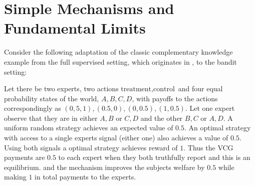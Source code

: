 







\section{Simple Mechanisms and Fundamental Limits}

Consider the following adaptation of the classic complementary knowledge example from the full supervised setting, which originates in \cite{geanakoplos1982we}, to the bandit setting:

\begin{eg}\label{eg:comp-ex}
	Let there be two experts, two actions ${\text{treatment},\text{control}}$ and four equal probability states of the world, ${A,B,C,D}$, with payoffs to the actions correspondingly as ${(0,5,1),(0.5,0),(0,0.5),(1,0.5)}$. Let one expert observe that they are in either ${A,B}$ or ${C,D}$ and the other ${B,C}$ or ${A,D}$. A uniform random strategy achieves an expected value of $0.5$. An optimal strategy with access to a single experts signal (either one) also achieves a value of $0.5$. Using both signals a optimal strategy achieves reward of $1$. Thus the VCG payments are $0.5$ to each expert when they both truthfully report and this is an equilibrium. and the mechanism improves the subjects welfare by $0.5$ while making $1$ in total payments to the experts. 
\end{eg}


